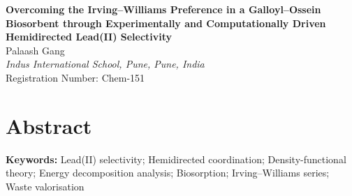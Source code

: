 %
%
\thispagestyle{fancy}
\begin{center}
\begin{minipage}{0.95\linewidth}\centering
{}
{\large\bfseries Overcoming the Irving--Williams Preference in a Galloyl--Ossein Biosorbent
through Experimentally and Computationally Driven Hemidirected Lead(II) Selectivity}\\[6mm]
{Palaash Gang}\\[2mm]
{\small\itshape Indus International School, Pune, Pune, India}\\[2mm]
{\small Registration Number: Chem-151}
\end{minipage}
\end{center}
\vspace{8mm}

\section*{Abstract}


\vspace{4mm}
\noindent\textbf{Keywords:} Lead(II) selectivity; Hemidirected coordination; Density-functional
theory; Energy decomposition analysis; Biosorption; Irving--Williams series; Waste valorisation

\clearpage
